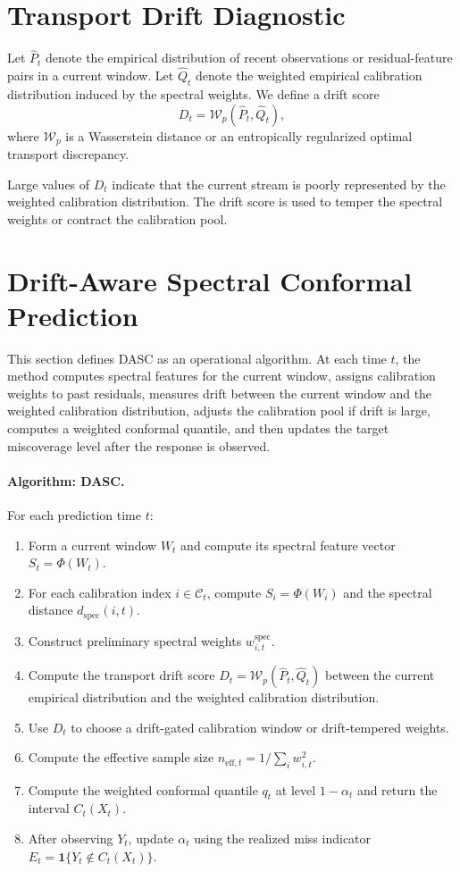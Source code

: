 \documentclass[11pt]{article}
\begin{document}
\section{Transport Drift Diagnostic}

Let $\widehat P_t$ denote the empirical distribution of recent observations or residual-feature pairs in a current window. Let $\widehat Q_t$ denote the weighted empirical calibration distribution induced by the spectral weights. We define a drift score
\[
    D_t = \mathcal{W}_p(\widehat P_t,\widehat Q_t),
\]
where $\mathcal{W}_p$ is a Wasserstein distance or an entropically regularized optimal transport discrepancy.

Large values of $D_t$ indicate that the current stream is poorly represented by the weighted calibration distribution. The drift score is used to temper the spectral weights or contract the calibration pool.

\section{Drift-Aware Spectral Conformal Prediction}

This section defines DASC as an operational algorithm. At each time $t$, the method computes spectral features for the current window, assigns calibration weights to past residuals, measures drift between the current window and the weighted calibration distribution, adjusts the calibration pool if drift is large, computes a weighted conformal quantile, and then updates the target miscoverage level after the response is observed.

\paragraph{Algorithm: DASC.}
For each prediction time $t$:
\begin{enumerate}[label=\arabic*.]
    \item Form a current window $W_t$ and compute its spectral feature vector $S_t=\Phi(W_t)$.
    \item For each calibration index $i\in\mathcal{C}_t$, compute $S_i=\Phi(W_i)$ and the spectral distance $d_{\mathrm{spec}}(i,t)$.
    \item Construct preliminary spectral weights $w^{\mathrm{spec}}_{i,t}$.
    \item Compute the transport drift score $D_t=\mathcal{W}_p(\widehat P_t,\widehat Q_t)$ between the current empirical distribution and the weighted calibration distribution.
    \item Use $D_t$ to choose a drift-gated calibration window or drift-tempered weights.
    \item Compute the effective sample size $n_{\mathrm{eff},t}=1/\sum_i w_{i,t}^2$.
    \item Compute the weighted conformal quantile $q_t$ at level $1-\alpha_t$ and return the interval $C_t(X_t)$.
    \item After observing $Y_t$, update $\alpha_t$ using the realized miss indicator $E_t=\mathbf{1}\{Y_t\notin C_t(X_t)\}$.
\end{enumerate}
\end{document}
